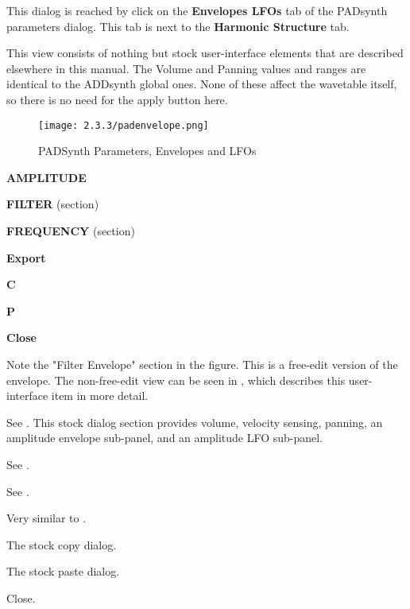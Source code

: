    This dialog is reached by click on the \textbf{Envelopes LFOs}
   tab of the PADsynth parameters dialog.  This tab is next to the
   \textbf{Harmonic Structure} tab.

   This view consists of nothing but stock user-interface elements that are
   described elsewhere in this manual.
   The Volume and Panning values and ranges are identical to the ADDsynth
   global ones.
   None of these affect the wavetable itself, so there is no need for the apply
   button here.

\begin{figure}[H]
   \centering
   \texttt{[image: 2.3.3/padenvelope.png]}
   \caption{PADSynth Parameters, Envelopes and LFOs}
   \label{fig:padsynth_parameters_envelopes_and_lfos}
\end{figure}

   \begin{enumber}
      \item \textbf{AMPLITUDE}
      \item \textbf{FILTER} (section)
      \item \textbf{FREQUENCY} (section)
      \item \textbf{Export}
      \item \textbf{C}
      \item \textbf{P}
      \item \textbf{Close}
   \end{enumber}

   Note the "Filter Envelope" section in the figure.  This is a free-edit
   version of the envelope.  The non-free-edit view can be seen in
   , which describes this user-interface item in more
   detail.

   See .
   This stock dialog section provides volume, velocity sensing, panning, an
   amplitude envelope sub-panel, and an amplitude LFO sub-panel.

   See .

   See .

   Very similar to
   .

   The stock copy dialog.

   The stock paste dialog.

   Close.


